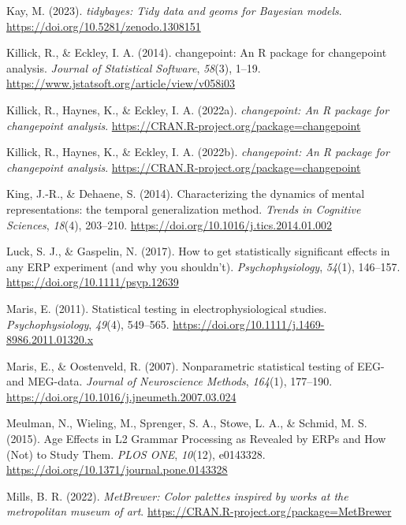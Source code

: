 \documentclass[
  doc,
  floatsintext,
  longtable,
  a4paper,
  nolmodern,
  notxfonts,
  notimes,
  colorlinks=true,linkcolor=blue,citecolor=blue,urlcolor=blue]{apa7}
\newlength{\cslhangindent}
\newenvironment{CSLReferences}[2] %
 {\begin{list}{}{%
  \setlength{\itemindent}{0pt}
  \setlength{\leftmargin}{0pt}
  \setlength{\parsep}{0pt}
  \ifodd #1
   \setlength{\leftmargin}{\cslhangindent}
   \setlength{\itemindent}{-1\cslhangindent}
  \fi
  \setlength{\itemsep}{#2\baselineskip}}}
 {\end{list}}
\begin{document}
\begin{CSLReferences}{1}{0}
Kay, M. (2023). \emph{{tidybayes}: Tidy data and geoms for {Bayesian}
models}. \url{https://doi.org/10.5281/zenodo.1308151}

Killick, R., \& Eckley, I. A. (2014). {changepoint}: An {R} package for
changepoint analysis. \emph{Journal of Statistical Software},
\emph{58}(3), 1--19.
\url{https://www.jstatsoft.org/article/view/v058i03}

Killick, R., Haynes, K., \& Eckley, I. A. (2022a). \emph{{changepoint}:
An {R} package for changepoint analysis}.
\url{https://CRAN.R-project.org/package=changepoint}

Killick, R., Haynes, K., \& Eckley, I. A. (2022b). \emph{{changepoint}:
An {R} package for changepoint analysis}.
\url{https://CRAN.R-project.org/package=changepoint}

King, J.-R., \& Dehaene, S. (2014). Characterizing the dynamics of
mental representations: the temporal generalization method. \emph{Trends
in Cognitive Sciences}, \emph{18}(4), 203--210.
\url{https://doi.org/10.1016/j.tics.2014.01.002}

Luck, S. J., \& Gaspelin, N. (2017). How to get statistically
significant effects in any {ERP} experiment (and why you shouldn't).
\emph{Psychophysiology}, \emph{54}(1), 146--157.
\url{https://doi.org/10.1111/psyp.12639}

Maris, E. (2011). Statistical testing in electrophysiological studies.
\emph{Psychophysiology}, \emph{49}(4), 549--565.
\url{https://doi.org/10.1111/j.1469-8986.2011.01320.x}

Maris, E., \& Oostenveld, R. (2007). Nonparametric statistical testing
of EEG- and MEG-data. \emph{Journal of Neuroscience Methods},
\emph{164}(1), 177--190.
\url{https://doi.org/10.1016/j.jneumeth.2007.03.024}

Meulman, N., Wieling, M., Sprenger, S. A., Stowe, L. A., \& Schmid, M.
S. (2015). Age Effects in L2 Grammar Processing as Revealed by ERPs and
How (Not) to Study Them. \emph{PLOS ONE}, \emph{10}(12), e0143328.
\url{https://doi.org/10.1371/journal.pone.0143328}

Mills, B. R. (2022). \emph{{MetBrewer}: Color palettes inspired by works
at the metropolitan museum of art}.
\url{https://CRAN.R-project.org/package=MetBrewer}


\end{CSLReferences}
\end{document}
